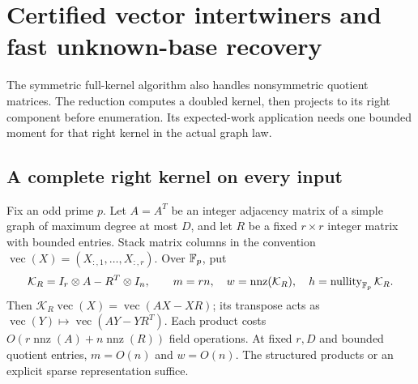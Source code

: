 \section{Certified vector intertwiners and fast unknown-base recovery}
\label{sec:vector-algorithm}
The symmetric full-kernel algorithm also handles nonsymmetric quotient
matrices. The reduction computes a doubled kernel, then projects to its
right component before enumeration. Its expected-work application needs
one bounded moment for that right kernel in the actual graph law.

\subsection{A complete right kernel on every input}
Fix an odd prime $p$. Let $A=A^T$ be an integer adjacency matrix of a
simple graph of maximum degree at most $D$, and let $R$ be a fixed
$r\times r$ integer matrix with bounded entries. Stack matrix columns
in the convention $\operatorname{vec}(X)=(X_{:,1},\ldots,X_{:,r})$.
Over $\mathbb F_p$, put
\begin{equation}\label{eq:vector-operator}
 \mathcal K_R=I_r\otimes A-R^T\otimes I_n,\qquad
 m=rn,\quad w=\operatorname{nnz}(\mathcal K_R),\quad
 h=\operatorname{nullity}_{\mathbb F_p}\mathcal K_R.
\end{equation}
Then $\mathcal K_R\operatorname{vec}(X)=\operatorname{vec}(AX-XR)$;
its transpose acts as $\operatorname{vec}(Y)\mapsto
\operatorname{vec}(AY-YR^T)$. Each product costs
$O(r\operatorname{nnz}(A)+n\operatorname{nnz}(R))$ field operations.
At fixed $r,D$ and bounded quotient entries, $m=O(n)$ and $w=O(n)$.
The structured products or an explicit sparse representation suffice.

